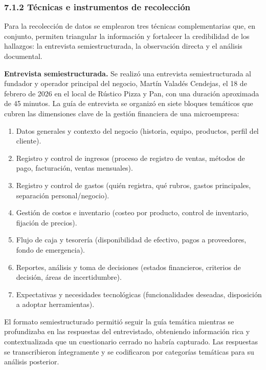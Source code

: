 \documentclass[
  12pt,
  spanish,
]{article}
\providecommand{\tightlist}{%
  \setlength{\itemsep}{0pt}\setlength{\parskip}{0pt}}
\begin{document}
\hypertarget{tuxe9cnicas-e-instrumentos-de-recolecciuxf3n}{%
\subsubsection{7.1.2 Técnicas e instrumentos de
recolección}\label{tuxe9cnicas-e-instrumentos-de-recolecciuxf3n}}

Para la recolección de datos se emplearon tres técnicas complementarias
que, en conjunto, permiten triangular la información y fortalecer la
credibilidad de los hallazgos: la entrevista semiestructurada, la
observación directa y el análisis documental.

\textbf{Entrevista semiestructurada.} Se realizó una entrevista
semiestructurada al fundador y operador principal del negocio, Martín
Valadés Cendejas, el 18 de febrero de 2026 en el local de Rústico Pizza
y Pan, con una duración aproximada de 45 minutos. La guía de entrevista
se organizó en siete bloques temáticos que cubren las dimensiones clave
de la gestión financiera de una microempresa:

\begin{enumerate}
\def\labelenumi{\arabic{enumi}.}
\tightlist
\item
  Datos generales y contexto del negocio (historia, equipo, productos,
  perfil del cliente).
\item
  Registro y control de ingresos (proceso de registro de ventas, métodos
  de pago, facturación, ventas mensuales).
\item
  Registro y control de gastos (quién registra, qué rubros, gastos
  principales, separación personal/negocio).
\item
  Gestión de costos e inventario (costeo por producto, control de
  inventario, fijación de precios).
\item
  Flujo de caja y tesorería (disponibilidad de efectivo, pagos a
  proveedores, fondo de emergencia).
\item
  Reportes, análisis y toma de decisiones (estados financieros,
  criterios de decisión, áreas de incertidumbre).
\item
  Expectativas y necesidades tecnológicas (funcionalidades deseadas,
  disposición a adoptar herramientas).
\end{enumerate}

El formato semiestructurado permitió seguir la guía temática mientras se
profundizaba en las respuestas del entrevistado, obteniendo información
rica y contextualizada que un cuestionario cerrado no habría capturado.
Las respuestas se transcribieron íntegramente y se codificaron por
categorías temáticas para su análisis posterior.
\end{document}
